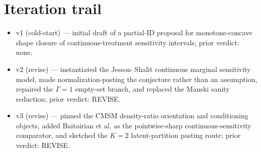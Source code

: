 \documentclass[11pt]{article}
\theoremstyle{definition}
\theoremstyle{plain}
\theoremstyle{remark}
\begin{document}
\section{Iteration trail}
\begin{itemize}[leftmargin=2em]
\item v1 (cold-start) --- initial draft of a partial-ID proposal for monotone-concave shape closure of continuous-treatment sensitivity intervals; prior verdict: none.
\item v2 (revise) --- instantiated the Jesson--Shalit continuous marginal sensitivity model, made normalization-pasting the conjecture rather than an assumption, repaired the \(\Gamma=1\) empty-set branch, and replaced the Manski sanity reduction; prior verdict: REVISE.
\item v3 (revise) --- pinned the CMSM density-ratio orientation and conditioning objects, added Baitairian et al. as the pointwise-sharp continuous-sensitivity comparator, and sketched the \(K=2\) latent-partition pasting route; prior verdict: REVISE.
\end{itemize}
\end{document}
